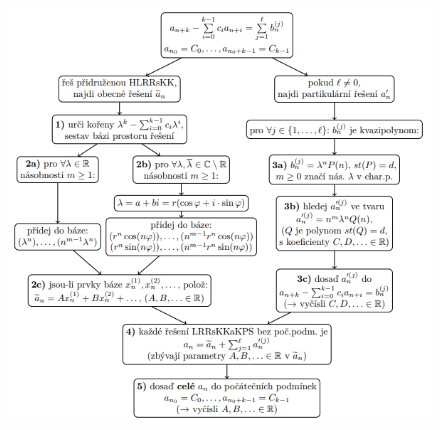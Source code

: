 \documentclass{szzclass}
\begin{document}
\begin{figure}[h]
    \includegraphics[width=1\textwidth, center]{topics/bi-spol-32/images/kuchar.PNG}
\end{figure}
\end{document}
